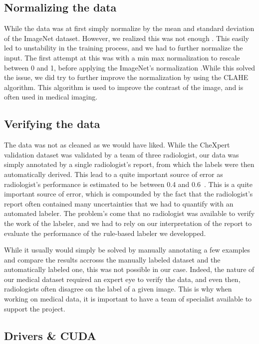 \documentclass[11pt]{article}
\begin{document}
    \subsection{Normalizing the data}

        While the data was at first simply normalize by the mean and standard deviation of the ImageNet dataset.
        However, we realized this was not enough . This easily led to unstability in the training process, and we had to further
        normalize the input. The first attempt at this was with a min max normalization to rescale between 0 and 1, before applying the ImageNet's normalization
        .While this solved the issue, we did try to further improve the normalization by using the CLAHE algorithm. This algorithm is used to improve the contrast of the image, and is often used in medical imaging.

    \subsection{Verifying the data}
            The data was not as cleaned as we would have liked. While the CheXpert validation dataset was validated by a team of three radiologist, our data
            was simply annotated by a single radiologist's report, from which the labels were then automatically derived. This lead to a quite important source of error as radiologist's performance
            is estimated to be between 0.4 and 0.6~\cite{chexzero}. This is a quite important source of error, which is compounded
            by the fact that the radiologist's report often contained many uncertainties that we had
            to quantify with an automated labeler. The problem's come that no radiologist was available to verify the work of the labeler, and we had to rely on our interpretation of
            the report to evaluate the performance of the rule-based labeler we developped.

            While it usually would simply be solved by manually annotating a few examples and compare the results accrosss the manually labeled dataset
            and the automatically labeled one, this was not possible in our case. Indeed, the nature of our medical dataset required an expert eye to verify the data,
            and even then, radiologists often disagree on the label of a given image. This is why when working on medical data, it is important to have a team of specialist available to support the project.


    \subsection{Drivers \& CUDA}
\end{document}
